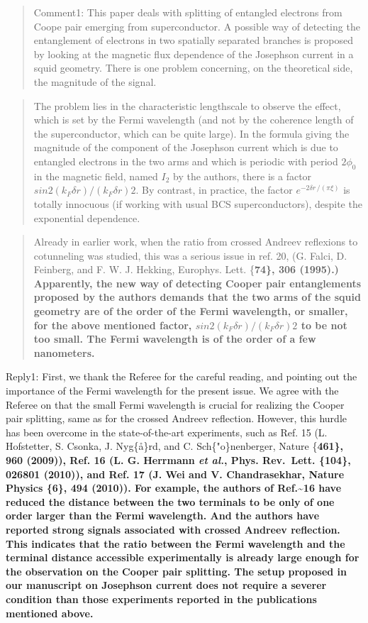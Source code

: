 \documentclass[11pt]{article}
\begin{document}
\begin{quote}
Comment1: This paper deals with splitting of entangled electrons from
Coope pair emerging from superconductor. A possible way of detecting the
entanglement of electrons in two spatially separated branches is
proposed by looking at the magnetic flux dependence of the Josephson
current in a squid geometry. There is one problem concerning, on the
theoretical side, the magnitude of the signal.
\end{quote}

\begin{quote}
The problem lies in the characteristic lengthscale to observe the
effect, which is set by the Fermi wavelength (and not by the coherence
length of the superconductor, which can be quite large). In the formula
giving the magnitude of the component of the Josephson current which is
due to entangled electrons in the two arms and which is periodic with
period \(2 \phi_0\) in the magnetic field, named \(I_2\) by the authors,
there is a factor \(sin2(k_F \delta r)/(k_F \delta r)2\). By contrast,
in practice, the factor \(e^{- 2 \delta r \, / (\pi \xi)}\) is totally
innocuous (if working with usual BCS superconductors), despite the
exponential dependence.
\end{quote}

\begin{quote}
Already in earlier work, when the ratio from crossed Andreev reflexions
to cotunneling was studied, this was a serious issue in ref. 20, (G.
Falci, D. Feinberg, and F. W. J. Hekking, Europhys. Lett. \{\bf 74\},
306 (1995).) Apparently, the new way of detecting Cooper pair
entanglements proposed by the authors demands that the two arms of the
squid geometry are of the order of the Fermi wavelength, or smaller, for
the above mentioned factor, \(sin2(k_F \delta r)/(k_F \delta r)2\) to be
not too small. The Fermi wavelength is of the order of a few nanometers.
\end{quote}

Reply1: First, we thank the Referee for the careful reading, and
pointing out the importance of the Fermi wavelength for the present
issue. We agree with the Referee on that the small Fermi wavelength is
crucial for realizing the Cooper pair splitting, same as for the crossed
Andreev reflection. However, this hurdle has been overcome in the
state-of-the-art experiments, such as Ref. 15 (L. Hofstetter, S. Csonka,
J. Nyg\{\aa\}rd, and C. Sch\{"o\}nenberger, Nature \{\bf 461\}, 960
(2009)), Ref. 16 (L. G. Herrmann \emph{et
al.}, Phys. Rev.~Lett. \{\bf 104\}, 026801 (2010)), and Ref. 17 (J. Wei
and V. Chandrasekhar, Nature Physics \{\bf 6\}, 494 (2010)). For
example, the authors of Ref.\textasciitilde{}16 have reduced the
distance between the two terminals to be only of one order larger than
the Fermi wavelength. And the authors have reported strong signals
associated with crossed Andreev reflection. This indicates that the
ratio between the Fermi wavelength and the terminal distance accessible
experimentally is already large enough for the observation on the Cooper
pair splitting. The setup proposed in our manuscript on Josephson
current does not require a severer condition than those experiments
reported in the publications mentioned above.
\end{document}
